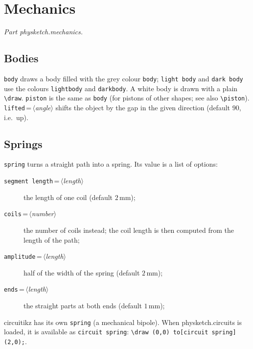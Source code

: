 \documentclass[a4paper,11pt]{article}
\newcommand\pkg[1]{\textsf{#1}}
\newcommand\cs[1]{\texttt{\textbackslash#1}}
\newcommand\key[1]{\texttt{#1}}
\newcommand\meta[1]{\ensuremath{\langle}\textit{#1}\ensuremath{\rangle}}
\begin{document}
\section{Mechanics}
\emph{Part \pkg{physketch.mechanics}.}

\subsection{Bodies}
\key{body} draws a body filled with the grey colour \texttt{body};
\key{light body} and \key{dark body} use the colours \texttt{lightbody} and
\texttt{darkbody}. A white body is drawn with a plain \cs{draw}.
\key{piston} is the same as \key{body} (for pistons of other shapes; see
also \cs{piston}). \key{lifted}\,=\,\meta{angle} shifts the object by the
gap in the given direction (default \(90\), i.e.\ up).
\begin{example}
\end{example}

\subsection{Springs}
\key{spring} turns a straight path into a spring. Its value is a list of
options:
\begin{description}
  \item[\key{segment length}\,=\,\meta{length}] the length of one coil
    (default \(2\,\mathrm{mm}\));
  \item[\key{coils}\,=\,\meta{number}] the number of coils instead; the
    coil length is then computed from the length of the path;
  \item[\key{amplitude}\,=\,\meta{length}] half of the width of the spring
    (default \(2\,\mathrm{mm}\));
  \item[\key{ends}\,=\,\meta{length}] the straight parts at both ends
    (default \(1\,\mathrm{mm}\));
\end{description}
\begin{example}
\end{example}
\pkg{circuitikz} has its own \key{spring} (a mechanical bipole). When
\pkg{physketch.circuits} is loaded, it is available as \key{circuit spring}:
\verb|\draw (0,0) to[circuit spring] (2,0);|.
\end{document}
